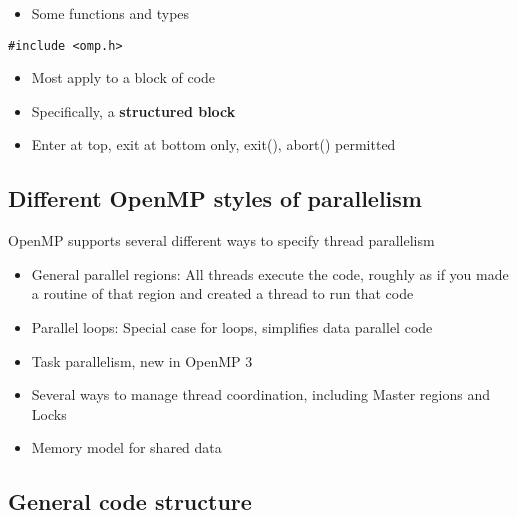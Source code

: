 \documentclass[%
oneside,                 %
final,                   %
10pt]{article}
\begin{document}
\begin{itemize}
 \item Some functions and types 
\end{itemize}

\noindent


\begin{verbatim}
#include <omp.h>

\end{verbatim}

\begin{itemize}
 \item Most apply to a block of code

 \item Specifically, a \textbf{structured block}

 \item Enter at top, exit at bottom only, exit(), abort() permitted
\end{itemize}

\noindent
\subsection*{Different OpenMP styles of parallelism}
OpenMP supports several different ways to specify thread parallelism

\begin{itemize}
\item General parallel regions: All threads execute the code, roughly as if you made a routine of that region and created a thread to run that code

\item Parallel loops: Special case for loops, simplifies data parallel code

\item Task parallelism, new in OpenMP 3

\item Several ways to manage thread coordination, including Master regions and Locks

\item Memory model for shared data
\end{itemize}

\noindent
\subsection*{General code structure}

\end{document}
